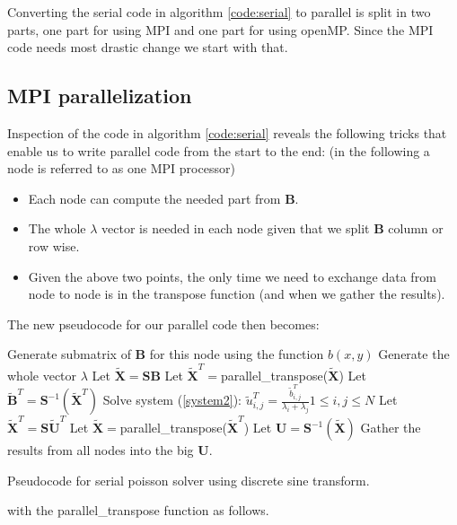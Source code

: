 Converting the serial code in algorithm \ref{code:serial} to parallel is split in two parts, one part for using MPI and one part for using openMP. Since the MPI code needs most drastic change we start with that.

\subsection*{MPI parallelization}
Inspection of the code in algorithm \ref{code:serial} reveals the following tricks that enable us to write parallel code from the start to the end: (in the following a node is referred to as one MPI processor)
\begin{itemize}
\item Each node can compute the needed part from $\textbf{B}$.
\item The whole $\lambda$ vector is needed in each node given that we split $\textbf{B}$ column or row wise.
\item Given the above two points, the only time we need to exchange data from node to node is in the transpose function (and when we gather the results).
\end{itemize}

The new pseudocode for our parallel code then becomes:

\begin{algorithm}[H]
 Generate submatrix of $\textbf{B}$ for this node using the function $b(x,y)$\;
 Generate the whole vector $\lambda$ \;
 Let $\mathbf{\widetilde{X}} = \mathbf{SB}$  \;
 Let $\mathbf{\widetilde{X}}^T = $parallel\_transpose($\mathbf{\widetilde{X}}$)   \;
 Let $\mathbf{\widetilde{B}}^T = \mathbf{S}^{-1}(\mathbf{\widetilde{X}}^T)$ \;
 Solve system (\ref{system2}): $\tilde{u}^T_{i,j} = \frac{\tilde{b}^T_{i,j}}{\lambda_i + \lambda_j} 1 \leq i, j \leq N$\;
 Let $\mathbf{\widetilde{X}}^T = \mathbf{S}\mathbf{\tilde{U}}^T$  \;
 Let $\mathbf{\widetilde{X}} = $parallel\_transpose($\mathbf{\widetilde{X}}^T$)   \;
 Let $\mathbf{U} = \mathbf{S}^{-1}(\mathbf{\widetilde{X}}) $ \;
 Gather the results from all nodes into the big $\mathbf{U}$.
 \caption{Pseudocode for serial poisson solver using discrete sine transform.}
 \label{code:parallel}
\end{algorithm}

with the parallel\_transpose function as follows.

